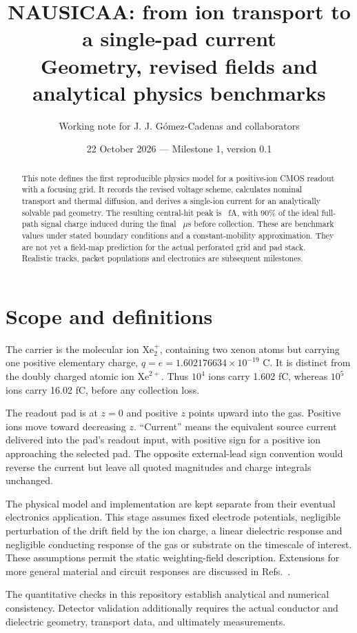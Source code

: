 \documentclass[11pt,a4paper]{article}
\title{NAUSICAA: from ion transport to a single-pad current\\[4pt]
\large Geometry, revised fields and analytical physics benchmarks}
\author{Working note for J. J. G\'omez-Cadenas and collaborators}
\date{22 October 2026 \quad --- \quad Milestone 1, version 0.1}
\newcommand{\ion}{\ensuremath{\mathrm{Xe}_2^+}}
\begin{document}
\maketitle
\thispagestyle{fancy}
\begin{abstract}
This note defines the first reproducible physics model for a positive-ion CMOS
readout with a focusing grid. It records the revised voltage scheme, calculates
nominal transport and thermal diffusion, and derives a single-ion current for
an analytically solvable pad geometry. The resulting central-hit peak is
\PeakCurrent\ fA, with 90\% of the ideal full-path signal charge induced during
the final \FinalNinetyTime\ $\mu$s before collection. These are benchmark values
under stated boundary conditions and a constant-mobility approximation. They
are not yet a field-map prediction for the actual perforated grid and pad stack.
Realistic tracks, packet populations and electronics are subsequent milestones.
\end{abstract}

\section{Scope and definitions}
The carrier is the molecular ion \ion, containing two xenon atoms but carrying
one positive elementary charge, $q=e=1.602176634\times10^{-19}$ C. It is distinct
from the doubly charged atomic ion $\mathrm{Xe}^{2+}$. Thus $10^4$ ions carry
1.602 fC, whereas $10^5$ ions carry 16.02 fC, before any collection loss.

The readout pad is at $z=0$ and positive $z$ points upward into the gas. Positive
ions move toward decreasing $z$. ``Current'' means the equivalent source
current delivered into the pad's readout input, with positive sign for a positive
ion approaching the selected pad. The opposite external-lead sign convention
would reverse the current but leave all quoted magnitudes and charge integrals
unchanged.

The physical model and implementation are kept separate from their eventual
electronics application. This stage assumes fixed electrode potentials,
negligible perturbation of the drift field by the ion charge, a linear dielectric
response and negligible conducting response of the gas or substrate on the
timescale of interest. These assumptions permit the static weighting-field
description. Extensions for more general material and circuit responses are
discussed in Refs.~\cite{riegler2016,riegler2019}.

The quantitative checks in this repository establish analytical and numerical
consistency. Detector validation additionally requires the actual conductor and
dielectric geometry, transport data, and ultimately measurements.
\end{document}
